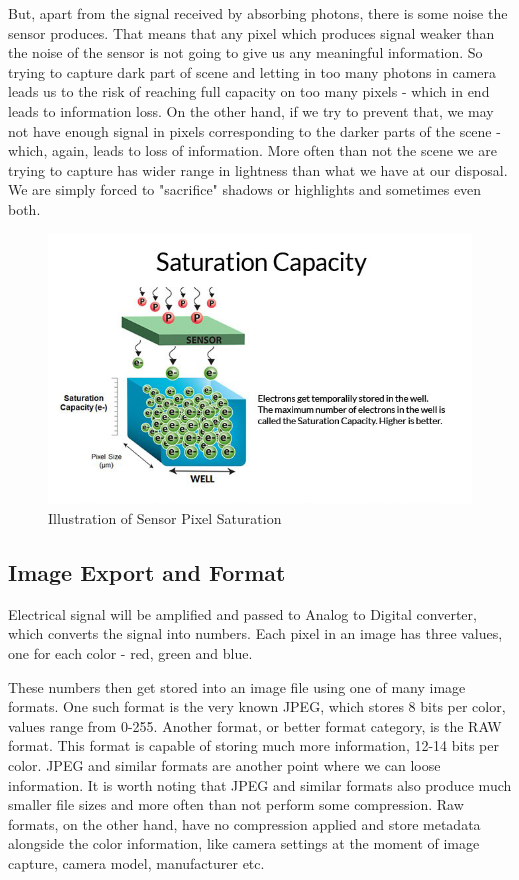 \documentclass{article}
\begin{document}
But, apart from the signal received by absorbing photons, there is some noise the sensor produces.
That means that any pixel which produces signal weaker than the noise of the sensor is not going to give us any meaningful information.
So trying to capture dark part of scene and letting in too many photons in camera leads us to the risk of reaching full
capacity on too many pixels - which in end leads to information loss. 
On the other hand, if we try to prevent that, we may not have enough signal in pixels corresponding to the
darker parts of the scene - which, again, leads to loss of information. 
More often than not the scene we are trying to capture has wider range in lightness than what we have at our disposal.
We are simply forced to "sacrifice" shadows or highlights and sometimes even both.
\begin{figure}[H]
    \centering
    \includegraphics[width = 1.0\linewidth]{images/saturation-capacity-large.png}
    \caption{Illustration of Sensor Pixel Saturation \cite{sensor:Saturation}}
    \label{fig:sensorSaturation}
\end{figure}

\subsection{Image Export and Format}
Electrical signal will be amplified and passed to Analog to Digital converter, which converts the signal into numbers.
Each pixel in an image has three values, one for each color - red, green and blue. 

These numbers then get stored into an image file using one of many image formats. 
One such format is the very known JPEG, which stores 8 bits per color, values range from 0-255.
Another format, or better format category, is the RAW format. This format is capable of storing much more information, 12-14 bits per color. JPEG and similar formats are another point where we can loose information.
It is worth noting that JPEG and similar formats also produce much smaller file sizes and more often than not perform some compression.
Raw formats, on the other hand, have no compression applied and store metadata alongside the color information,
like camera settings at the moment of image capture, camera model, manufacturer etc.
\end{document}
